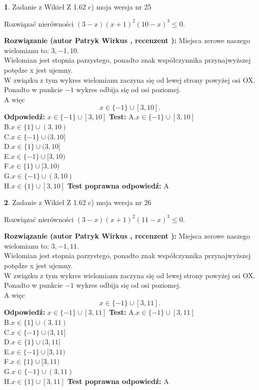 \documentclass[12pt, a4paper]{article}
\theoremstyle{definition} %
\newtheorem{zad}{}
\newcommand{\zadStart}[1]{\begin{zad}#1\newline}
\newcommand{\zadStop}{\end{zad}}
\newcommand{\rozwStart}[2]{\noindent \textbf{Rozwiązanie (autor #1 , recenzent #2): }\newline}
\newcommand{\rozwStop}{\newline}
\newcommand{\odpStart}{\noindent \textbf{Odpowiedź:}\newline}
\newcommand{\odpStop}{\newline}
\newcommand{\testStart}{\noindent \textbf{Test:}\newline}
\newcommand{\testStop}{\newline}
\newcommand{\kluczStart}{\noindent \textbf{Test poprawna odpowiedź:}\newline}
\newcommand{\kluczStop}{\newline}
\begin{document}
\zadStart{Zadanie z Wikieł Z 1.62 c) moja wersja nr 25}

Rozwiązać nierówności $(3-x)(x+1)^{2}(10-x)^{3}\le0$.
\zadStop
\rozwStart{Patryk Wirkus}{}
Miejsca zerowe naszego wielomianu to: $3, -1, 10$.\\
Wielomian jest stopnia parzystego, ponadto znak współczynnika przy\linebreak najwyższej potędze x jest ujemny.\\ W związku z tym wykres wielomianu zaczyna się od lewej strony powyżej osi OX.\\
Ponadto w punkcie $-1$ wykres odbija się od osi poziomej.\\
A więc $$x \in \{-1\} \cup [3,10].$$
\rozwStop
\odpStart
$x \in \{-1\} \cup [3,10]$
\odpStop
\testStart
A.$x \in \{-1\} \cup [3,10]$\\
B.$x \in \{1\} \cup (3,10)$\\
C.$x \in \{-1\} \cup (3,10]$\\
D.$x \in \{1\} \cup (3,10]$\\
E.$x \in \{-1\} \cup [3,10)$\\
F.$x \in \{1\} \cup [3,10)$\\
G.$x \in \{-1\} \cup (3,10)$\\
H.$x \in \{1\} \cup [3,10]$
\testStop
\kluczStart
A
\kluczStop



\zadStart{Zadanie z Wikieł Z 1.62 c) moja wersja nr 26}

Rozwiązać nierówności $(3-x)(x+1)^{2}(11-x)^{3}\le0$.
\zadStop
\rozwStart{Patryk Wirkus}{}
Miejsca zerowe naszego wielomianu to: $3, -1, 11$.\\
Wielomian jest stopnia parzystego, ponadto znak współczynnika przy\linebreak najwyższej potędze x jest ujemny.\\ W związku z tym wykres wielomianu zaczyna się od lewej strony powyżej osi OX.\\
Ponadto w punkcie $-1$ wykres odbija się od osi poziomej.\\
A więc $$x \in \{-1\} \cup [3,11].$$
\rozwStop
\odpStart
$x \in \{-1\} \cup [3,11]$
\odpStop
\testStart
A.$x \in \{-1\} \cup [3,11]$\\
B.$x \in \{1\} \cup (3,11)$\\
C.$x \in \{-1\} \cup (3,11]$\\
D.$x \in \{1\} \cup (3,11]$\\
E.$x \in \{-1\} \cup [3,11)$\\
F.$x \in \{1\} \cup [3,11)$\\
G.$x \in \{-1\} \cup (3,11)$\\
H.$x \in \{1\} \cup [3,11]$
\testStop
\kluczStart
A
\kluczStop
\end{document}
